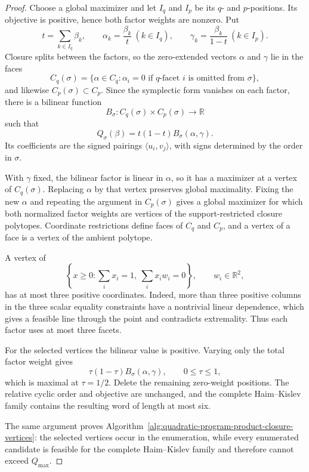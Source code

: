 \begin{proof}
Choose a global maximizer and let \(I_q\) and \(I_p\) be its \(q\)- and
\(p\)-positions.  Its objective is positive, hence both factor weights are
nonzero.  Put
\[
  t=\sum_{k\in I_q}\beta_k,\qquad
  \alpha_k=\frac{\beta_k}{t}\ (k\in I_q),\qquad
  \gamma_k=\frac{\beta_k}{1-t}\ (k\in I_p).
\]
Closure splits between the factors, so the zero-extended vectors \(\alpha\)
and \(\gamma\) lie in the faces
\[
  C_q(\sigma)=\{\alpha\in C_q:\alpha_i=0
    \text{ if \(q\)-facet \(i\) is omitted from \(\sigma\)}\},
\]
and likewise \(C_p(\sigma)\subset C_p\).  Since the symplectic form vanishes
on each factor, there is a bilinear function
\[
  B_\sigma:C_q(\sigma)\times C_p(\sigma)\longrightarrow\mathbb R
\]
such that
\begin{equation}\label{eq:quadratic-program-product-factorization}
  Q_\sigma(\beta)=t(1-t)B_\sigma(\alpha,\gamma).
\end{equation}
Its coefficients are the signed pairings
\(\langle u_i,v_j\rangle\), with signs determined by the order in \(\sigma\).

With \(\gamma\) fixed, the bilinear factor is linear in \(\alpha\),
so it has a maximizer at a vertex of \(C_q(\sigma)\).  Replacing \(\alpha\)
by that vertex preserves global maximality.  Fixing the new \(\alpha\) and
repeating the argument in \(C_p(\sigma)\) gives a global maximizer for which
both normalized factor weights are vertices of the support-restricted closure
polytopes.  Coordinate restrictions define faces of \(C_q\) and \(C_p\), and
a vertex of a face is a vertex of the ambient polytope.

A vertex of
\[
  \left\{x\geq0:\sum_i x_i=1,\ \sum_i x_iw_i=0\right\},
  \qquad w_i\in\mathbb{R}^2,
\]
has at most three positive coordinates.  Indeed, more than three positive
columns in the three scalar equality constraints have a nontrivial linear
dependence, which gives a feasible line through the point and contradicts
extremality.  Thus each factor uses at most three facets.

For the selected vertices the bilinear value is positive.  Varying only the
total factor weight gives
\[
  \tau(1-\tau)B_\sigma(\alpha,\gamma),\qquad 0\leq\tau\leq1,
\]
which is maximal at \(\tau=1/2\).  Delete the remaining zero-weight positions.
The relative cyclic order and objective are unchanged, and the complete
Haim--Kislev family contains the resulting word of length at most six.

The same argument proves
Algorithm~\ref{alg:quadratic-program-product-closure-vertices}: the selected
vertices occur in the enumeration, while every enumerated candidate is
feasible for the complete Haim--Kislev family and therefore cannot exceed
\(Q_{\max}\).
\end{proof}

